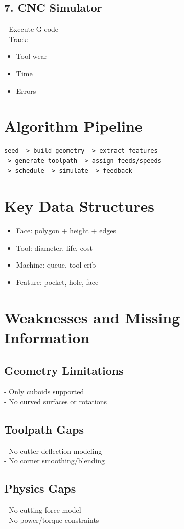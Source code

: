 \documentclass{article}
\begin{document}
\subsection{7. CNC Simulator}
- Execute G-code \\
- Track:
\begin{itemize}
\item Tool wear
\item Time
\item Errors
\end{itemize}

\section{Algorithm Pipeline}
\begin{verbatim}
seed -> build geometry -> extract features
-> generate toolpath -> assign feeds/speeds
-> schedule -> simulate -> feedback
\end{verbatim}

\section{Key Data Structures}
\begin{itemize}
\item Face: polygon + height + edges
\item Tool: diameter, life, cost
\item Machine: queue, tool crib
\item Feature: pocket, hole, face
\end{itemize}

\section{Weaknesses and Missing Information}

\subsection{Geometry Limitations}
- Only cuboids supported \\
- No curved surfaces or rotations

\subsection{Toolpath Gaps}
- No cutter deflection modeling \\
- No corner smoothing/blending

\subsection{Physics Gaps}
- No cutting force model \\
- No power/torque constraints
\end{document}
